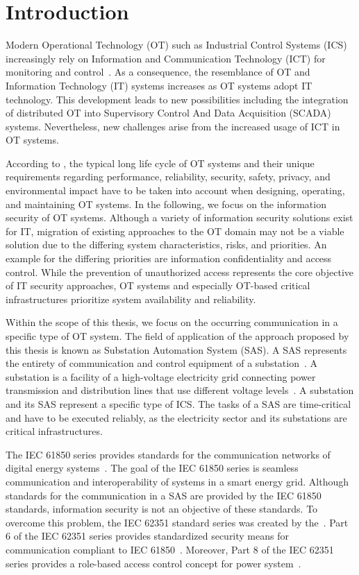 \chapter{Introduction}
\label{ch:introduction}
Modern Operational Technology (OT) such as Industrial Control Systems (ICS) increasingly rely on Information and Communication Technology (ICT) for monitoring and control~\cite{Stouffer2023}.
As a consequence, the resemblance of OT and Information Technology (IT) systems increases as OT systems adopt IT technology.
This development leads to new possibilities including the integration of distributed OT into Supervisory Control And Data Acquisition (SCADA) systems.
Nevertheless, new challenges arise from the increased usage of ICT in OT systems.

According to \citeauthor{Stouffer2023} \cite{Stouffer2023}, the typical long life cycle of OT systems and their unique requirements regarding performance, reliability, security, safety, privacy, and environmental impact have to be taken into account when designing, operating, and maintaining OT systems.
In the following, we focus on the information security of OT systems.
Although a variety of information security solutions exist for IT, migration of existing approaches to the OT domain may not be a viable solution due to the differing system characteristics, risks, and priorities.
An example for the differing priorities are information confidentiality and access control.
While the prevention of unauthorized access represents the core objective of IT security approaches, OT systems and especially OT-based critical infrastructures prioritize system availability and reliability.

Within the scope of this thesis, we focus on the occurring communication in a specific type of OT system.
The field of application of the approach proposed by this thesis is known as Substation Automation System (SAS).
A SAS represents the entirety of communication and control equipment of a substation~\cite{Padilla2015}.
A substation is a facility of a high-voltage electricity grid connecting power transmission and distribution lines that use different voltage levels~\cite{oshaSubstation}.
A substation and its SAS represent a specific type of ICS.
The tasks of a SAS are time-critical and have to be executed reliably, as the electricity sector and its substations are critical infrastructures.

The IEC 61850 series provides standards for the communication networks of digital energy systems~\cite{IEC61850P5}.
The goal of the IEC 61850 series is seamless communication and interoperability of systems in a smart energy grid.
Although standards for the communication in a SAS are provided by the IEC 61850 standards, information security is not an objective of these standards.
To overcome this problem, the IEC 62351 standard series was created by the~\citeauthor{IEC62351P6}.
Part 6 of the IEC 62351 series provides standardized security means for communication compliant to IEC 61850~\cite{IEC62351P6}.
Moreover, Part 8 of the IEC 62351 series provides a role-based access control concept for power system~\cite{IEC62351P8}.

